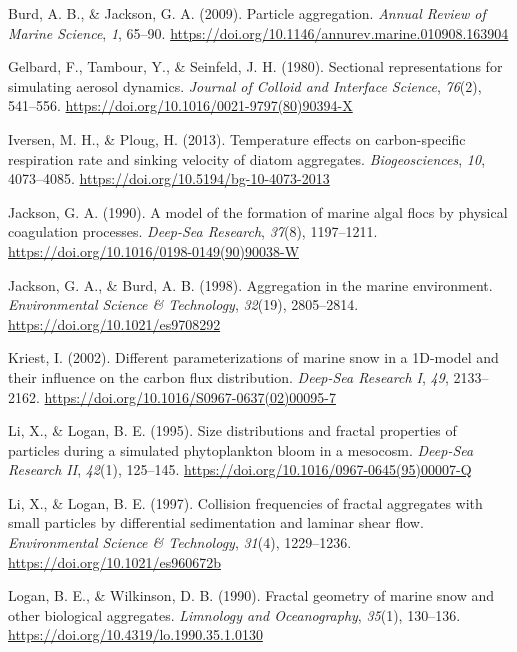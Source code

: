 \documentclass[12pt,a4paper]{report}
\numberwithin{equation}{chapter}
\begin{document}
Burd, A. B., \& Jackson, G. A. (2009). Particle aggregation.
\textit{Annual Review of Marine Science}, \textit{1}, 65--90.
\href{https://doi.org/10.1146/annurev.marine.010908.163904}{https://doi.org/10.1146/annurev.marine.010908.163904}

Gelbard, F., Tambour, Y., \& Seinfeld, J. H. (1980). Sectional representations
for simulating aerosol dynamics. \textit{Journal of Colloid and Interface Science},
\textit{76}(2), 541--556.
\href{https://doi.org/10.1016/0021-9797(80)90394-X}{https://doi.org/10.1016/0021-9797(80)90394-X}

Iversen, M. H., \& Ploug, H. (2013). Temperature effects on carbon-specific
respiration rate and sinking velocity of diatom aggregates.
\textit{Biogeosciences}, \textit{10}, 4073--4085.
\href{https://doi.org/10.5194/bg-10-4073-2013}{https://doi.org/10.5194/bg-10-4073-2013}

Jackson, G. A. (1990). A model of the formation of marine algal flocs by physical
coagulation processes. \textit{Deep-Sea Research}, \textit{37}(8), 1197--1211.
\href{https://doi.org/10.1016/0198-0149(90)90038-W}{https://doi.org/10.1016/0198-0149(90)90038-W}

Jackson, G. A., \& Burd, A. B. (1998). Aggregation in the marine environment.
\textit{Environmental Science \& Technology}, \textit{32}(19), 2805--2814.
\href{https://doi.org/10.1021/es9708292}{https://doi.org/10.1021/es9708292}

Kriest, I. (2002). Different parameterizations of marine snow in a 1D-model
and their influence on the carbon flux distribution.
\textit{Deep-Sea Research I}, \textit{49}, 2133--2162.
\href{https://doi.org/10.1016/S0967-0637(02)00095-7}{https://doi.org/10.1016/S0967-0637(02)00095-7}

Li, X., \& Logan, B. E. (1995). Size distributions and fractal properties of
particles during a simulated phytoplankton bloom in a mesocosm.
\textit{Deep-Sea Research II}, \textit{42}(1), 125--145.
\href{https://doi.org/10.1016/0967-0645(95)00007-Q}{https://doi.org/10.1016/0967-0645(95)00007-Q}

Li, X., \& Logan, B. E. (1997). Collision frequencies of fractal aggregates with
small particles by differential sedimentation and laminar shear flow.
\textit{Environmental Science \& Technology}, \textit{31}(4), 1229--1236.
\href{https://doi.org/10.1021/es960672b}{https://doi.org/10.1021/es960672b}

Logan, B. E., \& Wilkinson, D. B. (1990). Fractal geometry of marine snow and
other biological aggregates. \textit{Limnology and Oceanography}, \textit{35}(1),
130--136.
\href{https://doi.org/10.4319/lo.1990.35.1.0130}{https://doi.org/10.4319/lo.1990.35.1.0130}
\end{document}
